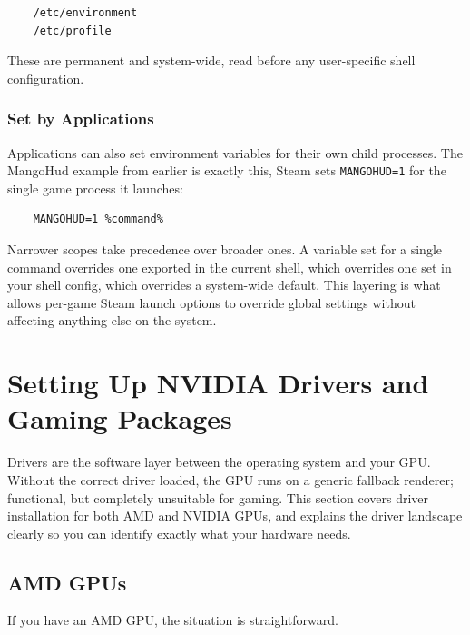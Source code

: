 \documentclass{article}
\newcommand{\code}[1]{\colorbox{codebg}{\texttt{#1}}}
\begin{document}
\begin{verbatim}
	/etc/environment
	/etc/profile
\end{verbatim}

\noindent These are permanent and system-wide, read before any user-specific shell configuration.

\subsubsection{Set by Applications}

Applications can also set environment variables for their own child processes.
The MangoHud example from earlier is exactly this, Steam sets
\code{MANGOHUD=1} for the single game process it launches:

\begin{verbatim}
	MANGOHUD=1 %command%
\end{verbatim}

\begin{tcolorbox}[arc=12pt, outer arc=10pt,
	colback=blue!4!white, colframe=blue!40!black,
	title=\textbf{Scope Overrides}]
	Narrower scopes take precedence over broader ones. A variable set for a single
	command overrides one exported in the current shell, which overrides one set
	in your shell config, which overrides a system-wide default. This layering is
	what allows per-game Steam launch options to override global settings without
	affecting anything else on the system.
\end{tcolorbox}

\newpage
\section{Setting Up NVIDIA Drivers and Gaming Packages}
\label{sec:nvidia}

Drivers are the software layer between the operating system and your GPU. Without
the correct driver loaded, the GPU runs on a generic fallback renderer; functional, but completely unsuitable for gaming. This section covers driver
installation for both AMD and NVIDIA GPUs, and explains the driver landscape
clearly so you can identify exactly what your hardware needs.

\subsection{AMD GPUs}

If you have an AMD GPU, the situation is straightforward.
\end{document}
